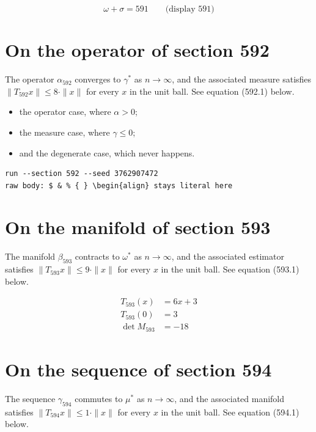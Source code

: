 \documentclass{article}
\begin{document}
$$
\omega + \sigma = 591 \qquad \text{(display 591)}
$$

\section{On the operator of section 592}
The operator $\alpha_{592}$ converges to $\gamma^{*}$ as $n \to \infty$,
and the associated measure satisfies $\|T_{592} x\| \leq 8 \cdot \|x\|$
for every $x$ in the unit ball. See equation (592.1) below.

\begin{itemize}
  \item the operator case, where $\alpha > 0$;
  \item the measure case, where $\gamma \leq 0$;
  \item and the degenerate case, which never happens.
\end{itemize}

\begin{verbatim}
run --section 592 --seed 3762907472
raw body: $ & % { } \begin{align} stays literal here
\end{verbatim}

\section{On the manifold of section 593}
The manifold $\beta_{593}$ contracts to $\omega^{*}$ as $n \to \infty$,
and the associated estimator satisfies $\|T_{593} x\| \leq 9 \cdot \|x\|$
for every $x$ in the unit ball. See equation (593.1) below.

\begin{align}
T_{593}(x) &= 6 x + 3 \\
T_{593}(0) &= 3 \\
\det M_{593} &= -18
\end{align}

\section{On the sequence of section 594}
The sequence $\gamma_{594}$ commutes to $\mu^{*}$ as $n \to \infty$,
and the associated manifold satisfies $\|T_{594} x\| \leq 1 \cdot \|x\|$
for every $x$ in the unit ball. See equation (594.1) below.
\end{document}
